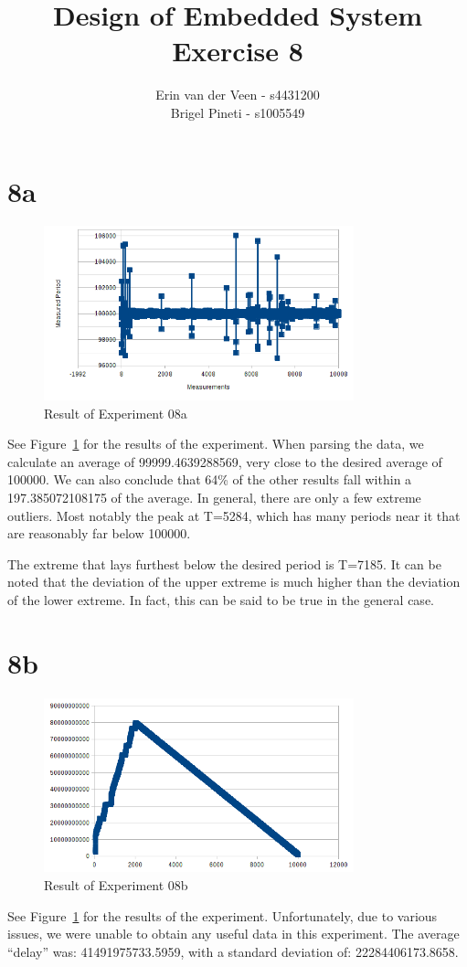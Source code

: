 \documentclass{scrartcl}
\title{Design of Embedded System\\Exercise 8}
\author{Erin van der Veen - s4431200\\
	Brigel Pineti - s1005549}
\begin{document}
\maketitle

\section*{8a}
\begin{figure}[!h]
	\centering
	\includegraphics[width=0.8\textwidth]{resulta}
	\caption{Result of Experiment 08a}
	\label{figure:8a}
\end{figure}

See Figure~\ref{figure:8a} for the results of the experiment.
When parsing the data, we calculate an average of 99999.4639288569, very close to the desired average of 100000.
We can also conclude that 64\% of the other results fall within a 197.385072108175 of the average.
In general, there are only a few extreme outliers.
Most notably the peak at T=5284, which has many periods near it that are reasonably far below 100000.

The extreme that lays furthest below the desired period is T=7185.
It can be noted that the deviation of the upper extreme is much higher than the deviation of the lower extreme.
In fact, this can be said to be true in the general case.

\section*{8b}
\begin{figure}[!h]
	\centering
	\includegraphics[width=0.8\textwidth]{resultb}
	\caption{Result of Experiment 08b}
	\label{figure:8b}
\end{figure}

See Figure~\ref{figure:8a} for the results of the experiment.
Unfortunately, due to various issues, we were unable to obtain any useful data in this experiment.
The average ``delay'' was: 41491975733.5959, with a standard deviation of: 22284406173.8658.
\end{document}

